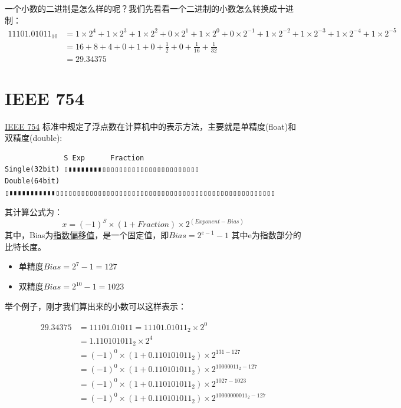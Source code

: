 \documentclass[12pt]{article}
\begin{document}
\makeblogtitle

一个小数的二进制是怎么样的呢？我们先看看一个二进制的小数怎么转换成十进制： \[
\begin{aligned} 
11101.01011_{10} &= 1 \times 2^{4} + 1 \times 2^{3} + 1 \times 2^{2} + 0 \times 2^{1} + 1 \times 2^{0} + 0 \times 2^{-1} + 1 \times 2^{-2} + 1 \times 2^{-3} + 1 \times 2^{-4} + 1 \times 2^{-5} \\
  &= 16 + 8 + 4 + 0 + 1 + 0 + \frac{1}{2} + 0 + \frac{1}{16} + \frac{1}{32} \\
  &= 29.34375
\end{aligned}
\]

\section{IEEE 754}\label{ieee-754}

\href{https://en.wikipedia.org/wiki/IEEE_754}{IEEE 754} 标准中规定了浮点数在计算机中的表示方法，主要就是单精度(float)和双精度(double):

\begin{verbatim}
              S Exp      Fraction
Single(32bit) ▯▮▮▮▮▮▮▮▮▯▯▯▯▯▯▯▯▯▯▯▯▯▯▯▯▯▯▯▯▯▯▯
Double(64bit) ▯▮▮▮▮▮▮▮▮▮▮▮▯▯▯▯▯▯▯▯▯▯▯▯▯▯▯▯▯▯▯▯▯▯▯▯▯▯▯▯▯▯▯▯▯▯▯▯▯▯▯▯▯▯▯▯▯▯▯▯▯▯▯▯
\end{verbatim}

其计算公式为： \[
x = (-1)^{S}\times(1+ Fraction)\times 2^{(Exponent-Bias)}
\] 其中，Bias为\href{https://zh.wikipedia.org/wiki/IEEE_754\#\%E6\%8C\%87\%E6\%95\%B8\%E5\%81\%8F\%E7\%A7\%BB\%E5\%80\%BC}{指数偏移值}，是一个固定值，即\(Bias=2^{e-1} - 1\) 其中e为指数部分的比特长度。

\begin{itemize}
\tightlist
\item
  单精度\(Bias = 2^{7} - 1 = 127\)
\item
  双精度\(Bias = 2^{10} -1 = 1023\)
\end{itemize}

举个例子，刚才我们算出来的小数可以这样表示：

\[
\begin{aligned} 
29.34375 &= 11101.01011 = 11101.01011_{2} \times 2^{0} \\
    &= 1.110101011_{2} \times 2^{4} \\
    &= (-1)^{0} \times (1 + 0.110101011_{2}) \times 2^{131 - 127} \\
    &= (-1)^{0} \times (1 + 0.110101011_{2}) \times 2^{10000011_{2} - 127} \\
    &= (-1)^{0} \times (1 + 0.110101011_{2}) \times 2^{1027 - 1023} \\
    &= (-1)^{0} \times (1 + 0.110101011_{2}) \times 2^{10000000011_{2} - 127} \\
\end{aligned}
\]
\end{document}
